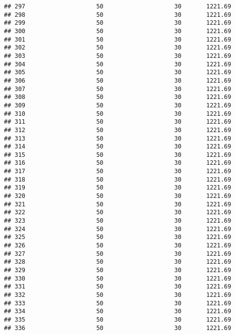 \documentclass[]{article}
\begin{document}
\begin{verbatim}
## 297                    50                    30       1221.69
## 298                    50                    30       1221.69
## 299                    50                    30       1221.69
## 300                    50                    30       1221.69
## 301                    50                    30       1221.69
## 302                    50                    30       1221.69
## 303                    50                    30       1221.69
## 304                    50                    30       1221.69
## 305                    50                    30       1221.69
## 306                    50                    30       1221.69
## 307                    50                    30       1221.69
## 308                    50                    30       1221.69
## 309                    50                    30       1221.69
## 310                    50                    30       1221.69
## 311                    50                    30       1221.69
## 312                    50                    30       1221.69
## 313                    50                    30       1221.69
## 314                    50                    30       1221.69
## 315                    50                    30       1221.69
## 316                    50                    30       1221.69
## 317                    50                    30       1221.69
## 318                    50                    30       1221.69
## 319                    50                    30       1221.69
## 320                    50                    30       1221.69
## 321                    50                    30       1221.69
## 322                    50                    30       1221.69
## 323                    50                    30       1221.69
## 324                    50                    30       1221.69
## 325                    50                    30       1221.69
## 326                    50                    30       1221.69
## 327                    50                    30       1221.69
## 328                    50                    30       1221.69
## 329                    50                    30       1221.69
## 330                    50                    30       1221.69
## 331                    50                    30       1221.69
## 332                    50                    30       1221.69
## 333                    50                    30       1221.69
## 334                    50                    30       1221.69
## 335                    50                    30       1221.69
## 336                    50                    30       1221.69

\end{verbatim}
\end{document}
